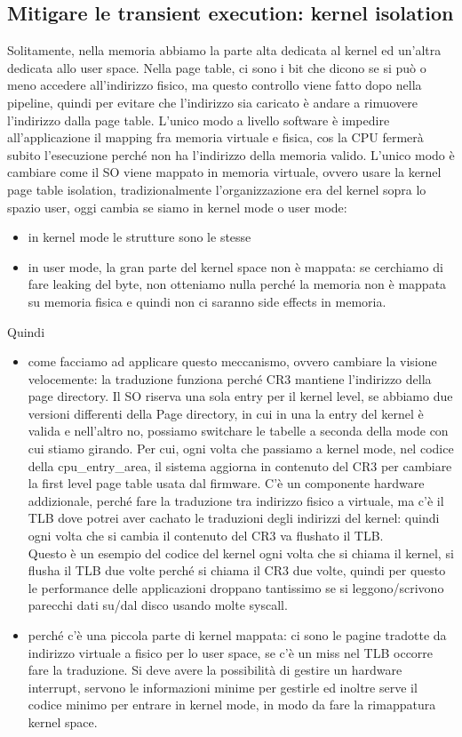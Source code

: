 \documentclass[12pt, oneside]{extbook} %
\begin{document}
\subsection{Mitigare le transient execution: kernel isolation}
Solitamente, nella memoria abbiamo la parte alta dedicata al kernel ed un'altra dedicata allo user space. Nella page table, ci sono i bit che dicono se si può o meno accedere all'indirizzo fisico, ma questo controllo viene fatto dopo nella pipeline, quindi per evitare che l'indirizzo sia caricato è andare a rimuovere l'indirizzo dalla page table. L'unico modo a livello software è impedire all'applicazione il mapping fra memoria virtuale e fisica, cos la CPU fermerà subito l'esecuzione perché non ha l'indirizzo della memoria valido. L'unico modo è cambiare come il SO viene mappato in memoria virtuale, ovvero usare la kernel page table isolation, tradizionalmente l'organizzazione era del kernel sopra lo spazio user, oggi cambia se siamo in kernel mode o user mode:
\begin{itemize}
\item in kernel mode le strutture sono le stesse
\item in user mode, la gran parte del kernel space non è mappata: se cerchiamo di fare leaking del byte, non otteniamo nulla perché la memoria non è mappata su memoria fisica e quindi non ci saranno side effects in memoria.
\end{itemize}
Quindi
\begin{itemize}
\item come facciamo ad applicare questo meccanismo, ovvero cambiare la visione velocemente: la traduzione funziona perché CR3 mantiene l'indirizzo della page directory. Il SO riserva una sola entry per il kernel level, se abbiamo due versioni differenti della Page directory, in cui in una la entry del kernel è valida e nell'altro no, possiamo switchare le tabelle a seconda della mode con cui stiamo girando. Per cui, ogni volta che passiamo a kernel mode, nel codice della \textsf{cpu\_entry\_area}, il sistema aggiorna in contenuto del CR3 per cambiare la first level page table usata dal firmware. C'è un componente hardware addizionale, perché fare la traduzione tra indirizzo fisico a virtuale, ma c'è il TLB dove potrei aver cachato le traduzioni degli indirizzi del kernel: quindi ogni volta che si cambia il contenuto del CR3 va flushato il TLB.\\ Questo è un esempio del codice del kernel
ogni volta che si chiama il kernel, si flusha il TLB due volte perché si chiama il CR3 due volte, quindi per questo le performance delle applicazioni droppano tantissimo se si leggono/scrivono parecchi dati su/dal disco usando molte syscall.
\item perché c'è una piccola parte di kernel mappata: ci sono le pagine tradotte da indirizzo virtuale a fisico per lo user space, se c'è un miss nel TLB occorre fare la traduzione. Si deve avere la possibilità di gestire un hardware interrupt, servono le informazioni minime per gestirle ed inoltre serve il codice minimo per entrare in kernel mode, in modo da fare la rimappatura kernel space.
\end{itemize}
\end{document}
